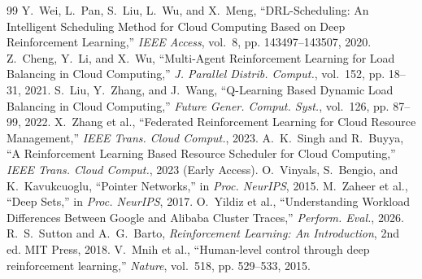 \documentclass[conference]{IEEEtran}
\begin{document}
\begin{thebibliography}{99}
 Y.~Wei, L.~Pan, S.~Liu, L.~Wu, and X.~Meng, ``DRL-Scheduling: An Intelligent Scheduling Method for Cloud Computing Based on Deep Reinforcement Learning,'' \textit{IEEE Access}, vol.~8, pp. 143497--143507, 2020.
 Z.~Cheng, Y.~Li, and X.~Wu, ``Multi-Agent Reinforcement Learning for Load Balancing in Cloud Computing,'' \textit{J. Parallel Distrib. Comput.}, vol.~152, pp. 18--31, 2021.
 S.~Liu, Y.~Zhang, and J.~Wang, ``Q-Learning Based Dynamic Load Balancing in Cloud Computing,'' \textit{Future Gener. Comput. Syst.}, vol.~126, pp. 87--99, 2022.
 X.~Zhang et al., ``Federated Reinforcement Learning for Cloud Resource Management,'' \textit{IEEE Trans. Cloud Comput.}, 2023.
 A.~K.~Singh and R.~Buyya, ``A Reinforcement Learning Based Resource Scheduler for Cloud Computing,'' \textit{IEEE Trans. Cloud Comput.}, 2023 (Early Access).
 O.~Vinyals, S.~Bengio, and K.~Kavukcuoglu, ``Pointer Networks,'' in \textit{Proc. NeurIPS}, 2015.
 M.~Zaheer et al., ``Deep Sets,'' in \textit{Proc. NeurIPS}, 2017.
 O.~Yildiz et al., ``Understanding Workload Differences Between Google and Alibaba Cluster Traces,'' \textit{Perform. Eval.}, 2026.
 R.~S.~Sutton and A.~G.~Barto, \textit{Reinforcement Learning: An Introduction}, 2nd ed. MIT Press, 2018.
 V.~Mnih et al., ``Human-level control through deep reinforcement learning,'' \textit{Nature}, vol.~518, pp. 529--533, 2015.
\end{thebibliography}
\end{document}
